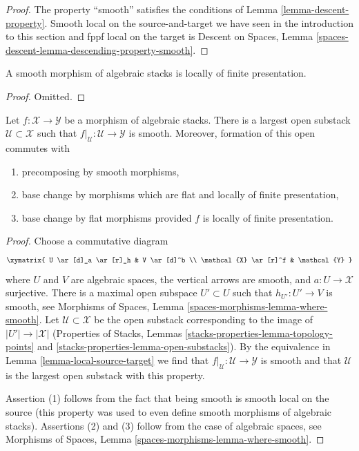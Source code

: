 \begin{proof}
The property ``smooth''
satisfies the conditions of Lemma \ref{lemma-descent-property}.
Smooth local on the source-and-target we have seen in the
introduction to this section and fppf local on the target is
Descent on Spaces, Lemma
\ref{spaces-descent-lemma-descending-property-smooth}.
\end{proof}

\begin{lemma}
\label{lemma-smooth-locally-finite-presentation}
A smooth morphism of algebraic stacks is locally of finite presentation.
\end{lemma}

\begin{proof}
Omitted.
\end{proof}

\begin{lemma}
\label{lemma-where-smooth}
Let $f : \mathcal{X} \to \mathcal{Y}$ be a morphism of algebraic stacks.
There is a largest open substack $\mathcal{U} \subset \mathcal{X}$
such that $f|_\mathcal{U} : \mathcal{U} \to \mathcal{Y}$ is smooth.
Moreover, formation of this open commutes with
\begin{enumerate}
\item precomposing by smooth morphisms,
\item base change by morphisms which are flat and locally of
finite presentation,
\item base change by flat morphisms provided $f$ is locally of
finite presentation.
\end{enumerate}
\end{lemma}

\begin{proof}
Choose a commutative diagram
$$
\xymatrix{
U \ar[d]_a \ar[r]_h & V \ar[d]^b \\
\mathcal{X} \ar[r]^f & \mathcal{Y}
}
$$
where $U$ and $V$ are algebraic spaces, the vertical arrows are smooth,
and $a : U \to \mathcal{X}$ surjective. There is a maximal open subspace
$U' \subset U$ such that $h_{U'} : U' \to V$ is smooth, see
Morphisms of Spaces, Lemma \ref{spaces-morphisms-lemma-where-smooth}.
Let $\mathcal{U} \subset \mathcal{X}$ be the open substack
corresponding to the image of $|U'| \to |\mathcal{X}|$
(Properties of Stacks, Lemmas \ref{stacks-properties-lemma-topology-points} and
\ref{stacks-properties-lemma-open-substacks}).
By the equivalence in Lemma \ref{lemma-local-source-target}
we find that $f|_\mathcal{U} : \mathcal{U} \to \mathcal{Y}$ is smooth
and that $\mathcal{U}$ is the largest open substack with this
property.

\medskip\noindent
Assertion (1) follows from the fact that being smooth
is smooth local on the source (this property was used to even define
smooth morphisms of algebraic stacks).
Assertions (2) and (3) follow from the case of algebraic spaces, see
Morphisms of Spaces, Lemma \ref{spaces-morphisms-lemma-where-smooth}.
\end{proof}

